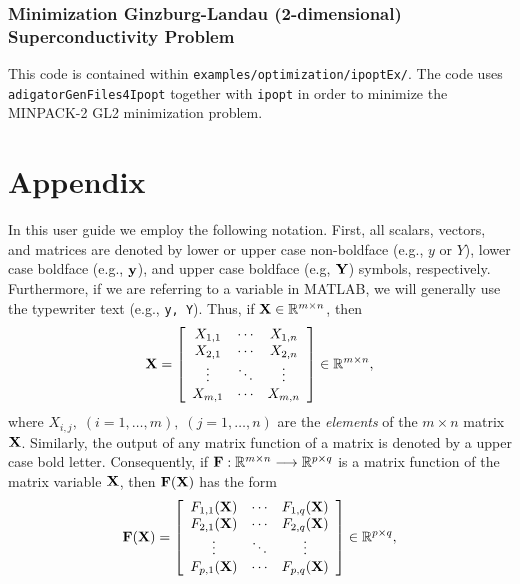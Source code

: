 \documentclass[10pt,pdftex]{article}
\begin{document}
\subsubsection{Minimization Ginzburg-Landau (2-dimensional) Superconductivity Problem}
This code is contained within \texttt{examples/optimization/ipoptEx/}. The code uses \texttt{adigatorGenFiles4Ipopt} together with \texttt{ipopt} in order to minimize the MINPACK-2 GL2 minimization problem.

\section*{Appendix}\hypertarget{Appendix}{}

In this user guide we employ the following notation.  First, all scalars, vectors, and matrices are denoted by lower or upper case non-boldface (e.g., $y$ or $Y$), lower case boldface (e.g., $\mathbf{y}$), and upper case boldface (e.g, $\mathbf{Y}$) symbols, respectively. Furthermore, if we are referring to a variable in MATLAB, we will generally use the typewriter text (e.g., \texttt{y, Y}).
Thus, if $\mathbf{X}\in\mathbb{R}^{m\times n}$, then
\begin{equation}\label{general-matrix-x}
  \mathbf{X} =
  \left[\begin{array}{ccc}
      X_{1,1} & \cdots & X_{1,n} \\
      X_{2,1} & \cdots & X_{2,n} \\
      \vdots & \ddots & \vdots \\
      X_{m,1} & \cdots & X_{m,n}
    \end{array}
  \right]\in\mathbb{R}^{m\times n}, 
\end{equation}
where $X_{i,j},\;(i=1,\ldots,m),\;(j=1,\ldots,n)$ are the {\em elements} 
of the $m\times n$ matrix $\mathbf{X}$.  Similarly, the output of any
matrix function of a matrix is denoted by a upper case bold letter.  Consequently,
if $\mathbf{F}:\mathbb{R}^{m\times n}\longrightarrow \mathbb{R}^{p\times q}$ is a matrix
function of the matrix variable $\mathbf{X}$, then $\mathbf{F}(\mathbf{X})$ has the form
\begin{equation}\label{general-matrix-f}
  \mathbf{F}(\mathbf{X}) =
  \left[
    \begin{array}{ccc}
      F_{1,1}(\mathbf{X}) & \cdots & F_{1,q}(\mathbf{X}) \\
      F_{2,1}(\mathbf{X}) & \cdots & F_{2,q}(\mathbf{X}) \\
      \vdots & \ddots & \vdots \\
      F_{p,1}(\mathbf{X}) & \cdots & F_{p,q}(\mathbf{X})
    \end{array}
  \right]\in\mathbb{R}^{p\times q},
\end{equation}
\end{document}
